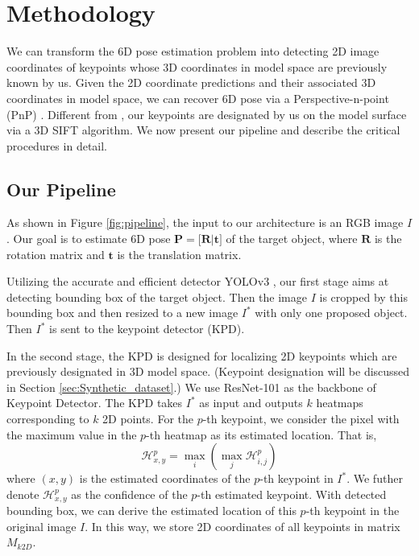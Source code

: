 \documentclass[10pt,twocolumn,letterpaper]{article}
\begin{document}
\section{Methodology}
We can transform the 6D pose estimation problem into detecting 2D image coordinates of keypoints whose 3D coordinates in model space are previously known by us. Given the 2D coordinate predictions and their associated 3D coordinates in model space, we can recover 6D pose via a Perspective-n-point (PnP) \cite{Lepetit2008EPnPAA}. Different from \cite{Rad2017BB8AS, tekin18}, our keypoints are designated by us on the model surface via a 3D SIFT \cite{Scovanner:2007:SDA:1291233.1291311} algorithm. We now present our pipeline and describe the critical procedures in detail.
\subsection{Our Pipeline}
\label{sec:pipeline}
As shown in Figure \ref{fig:pipeline}, the input to our architecture is an RGB image $I$. Our goal is to estimate 6D pose $\mathbf{P} = \big[\mathbf{R}\big|\mathbf{t}\big]$ of the target object, where $\mathbf{R}$ is the rotation matrix and $\mathbf{t}$ is the translation matrix.

Utilizing the accurate and efficient detector YOLOv3 \cite{DBLP:journals/corr/abs-1804-02767}, our first stage aims at detecting bounding box of the target object. Then the image $I$ is cropped by this bounding box and then resized to a new image $I^{*}$ with only one proposed object. Then $I^{*}$ is sent to the keypoint detector (KPD).

In the second stage, the KPD is designed for localizing 2D keypoints which are previously designated in 3D model space. (Keypoint designation will be discussed in Section \ref{sec:Synthetic_dataset}.) We use ResNet-101 \cite{DBLP:journals/corr/HeZRS15} as the backbone of Keypoint Detector. The KPD takes $I^{*}$ as input and outputs $k$ heatmaps corresponding to $k$ 2D points. For the $p$-th keypoint, we consider the pixel with the maximum value in the $p$-th heatmap as its estimated location. That is,
\begin{equation}
\label{eq:max_in_heatmap}
\mathcal{H}_{x,y}^{p} = \max_{i}(\max_{j} \mathcal{H}_{i,j}^{p})
\end{equation}
where $(x,y)$ is the estimated coordinates of the $p$-th keypoint in $I^{*}$. We futher denote $\mathcal{H}_{x,y}^{p}$ as the confidence of the $p$-th estimated keypoint. With detected bounding box, we can derive the estimated location of this $p$-th keypoint in the original image $I$. In this way, we store 2D coordinates of all keypoints in matrix $M_{k2D}$.
\end{document}
